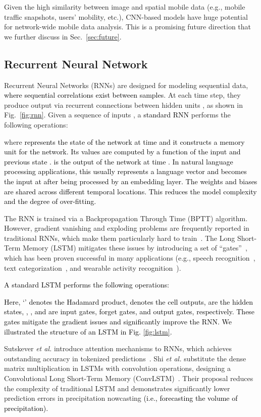 \documentclass[journal,comsoc,letter]{IEEEtran}
\newcommand{\edit}[1]{\textcolor{black}{#1}}
\newcommand{\rev}[1]{\textcolor{black}{#1}}
\begin{document}
Given the high similarity between image and spatial mobile data (e.g., mobile traffic snapshots, users' mobility, etc.), CNN-based models have huge potential for network-wide mobile data analysis. This is a promising future direction that we further discuss in Sec.~\ref{sec:future}.

\subsection{Recurrent Neural Network}
Recurrent Neural Networks (RNNs) are designed for modeling sequential data, \rev{where sequential correlations exist between samples}. At each time step, they produce output via recurrent connections between hidden units \cite{goodfellow2016deep}, as shown in Fig.~\ref{fig:rnn}. Given a sequence of inputs , a \rev{standard RNN} performs the following operations:

where \rev{ represents the state of the network at time  and it constructs a memory unit for the network. Its values are computed by a function of the input  and previous state .  is the output of the network at time . In natural language processing applications, this usually represents a language vector and becomes the input at  after being processed by an embedding layer. The weights  and biases  are shared across different temporal locations. This reduces the model complexity and the degree of over-fitting.}

The RNN is trained via a Backpropagation Through Time (BPTT) algorithm. However, gradient vanishing and exploding problems are frequently reported in traditional RNNs, which make them particularly hard to train~\cite{bengio1994learning}. The Long Short-Term Memory (LSTM) mitigates these issues by introducing a set of ``gates''~\cite{gers1999learning}, which has been proven successful in many applications (e.g., speech recognition~\cite{graves2013hybrid}, text categorization~\cite{johnson2016supervised}, and wearable activity recognition~\cite{ordonez2016deep}). \edit{A standard LSTM performs the following operations:

Here, `' denotes the Hadamard product,  denotes the cell outputs,   are the hidden states,  ,  , and   are input gates, forget gates, and output gates, respectively. These gates mitigate the gradient issues and significantly improve the RNN. We illustrated the structure of an LSTM in Fig. \ref{fig:lstm}.}

Sutskever \emph{et al.} introduce attention mechanisms to RNNs, which achieves outstanding accuracy in tokenized predictions~\cite{sutskever2014sequence}. Shi \emph{et al.} substitute the dense matrix multiplication in LSTMs with convolution operations, designing a Convolutional Long Short-Term Memory (ConvLSTM)~\cite{xingjian2015convolutional}. Their proposal reduces the complexity of traditional LSTM and demonstrates significantly lower prediction errors in precipitation \mbox{nowcasting} \edit{(i.e., forecasting the volume of precipitation).}
\end{document}
